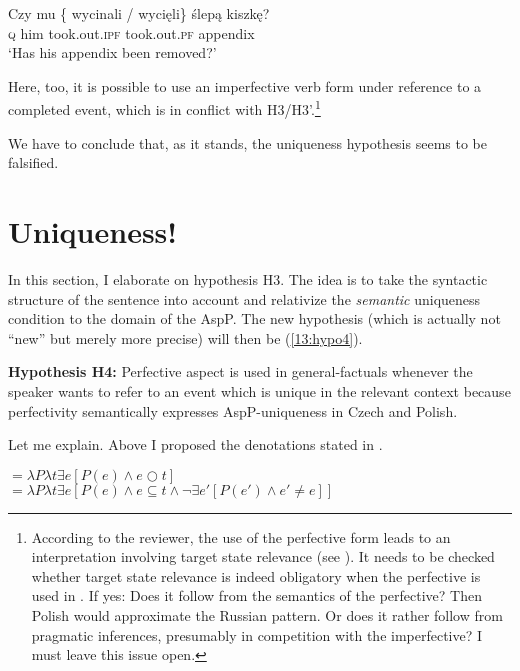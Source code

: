\documentclass[output=paper,modfonts,newtxmath,hidelinks]{langscibook}
\begin{document}
\begin{exe}
\ex\label{13:blinddarmpo}
\gll Czy mu  \{\hspace{-2pt} wycinali / wyci\k eli\}  {\'slep\k a kiszk\k e?} \\
\textsc{q} him {} took.out.\textsc{ipf} {} took.out.\textsc{pf} appendix \\
\glt `Has his appendix been removed?'
\end{exe}

\noindent Here, too, it is possible to use an imperfective verb form under reference to a completed event, which is in conflict with H3/H3'.\footnote{According to the reviewer, the use of the perfective form leads to an interpretation involving target state relevance (see ). It needs to be checked whether target state relevance is indeed obligatory when the perfective is used in . If yes: Does it follow from the semantics of the perfective? Then Polish would approximate the Russian pattern. Or does it rather follow from pragmatic inferences, presumably in competition with the imperfective? I must leave this issue open.}

We have to conclude that, as it stands, the uniqueness hypothesis seems to be falsified.  

\section{Uniqueness!}\label{13:s6} 

In this section, I elaborate on hypothesis H3. The idea is to take the syntactic structure of the sentence into account 
and relativize the \textit{semantic} uniqueness condition to the domain of the AspP. The new hypothesis (which is actually not ``new'' but merely more precise) will then be (\ref{13:hypo4}). 

\begin{exe}
\ex\label{13:hypo4}
\textbf{Hypothesis H4:} Perfective aspect is used in general-factuals whenever the speaker wants to refer to an event which is unique in the relevant context because perfectivity semantically expresses AspP-uniqueness in Czech and Polish. 
\end{exe}

\noindent Let me explain. Above I proposed the denotations stated in .

\begin{exe}
\ex\label{13:semas}
${}= \lambda P \lambda t \exists e [ P(e) \wedge e \bigcirc t ]$\smallskip\\
${}= \lambda P \lambda t \exists e [ P(e) \wedge e \subseteq t \wedge \neg \exists e'[ P(e') \wedge e' \neq e ]]$
\end{exe}
\end{document}
